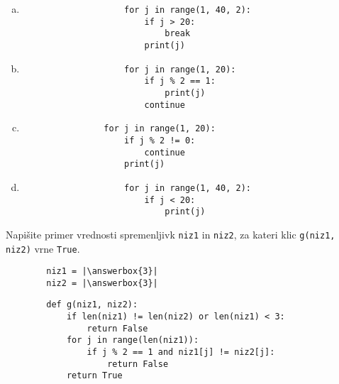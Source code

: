 \documentclass[arhiv, 10pt]{../izpit}
\newcommand{\inlinepy}[1]{\texttt{#1}}
\newcommand{\answerbox}[1]{\framebox{\vphantom{\large M}\hspace{#1cm}}}
\begin{document}
        \begin{multicols}{2}
        \begin{enumerate}[(a)]
\item 
                \begin{verbatim}
                    for j in range(1, 40, 2):
                        if j > 20:
                            break
                        print(j)
                \end{verbatim}
            
\item 
                \begin{verbatim}
                    for j in range(1, 20):
                        if j % 2 == 1:
                            print(j)
                        continue
                \end{verbatim}
            
\item 
            \begin{verbatim}
                for j in range(1, 20):
                    if j % 2 != 0:
                        continue
                    print(j)
            \end{verbatim}
        
\item 
                \begin{verbatim}
                    for j in range(1, 40, 2):
                        if j < 20:
                            print(j)
                \end{verbatim}
            
\end{enumerate}

        \end{multicols}
    
        \naloga*
        \begin{multicols}{2}
        \noindent
        Napišite primer vrednosti spremenljivk \inlinepy{niz1} in \inlinepy{niz2}, za kateri klic \inlinepy{g(niz1, niz2)} vrne \inlinepy{True}.
        \begin{verbatim}
        niz1 = |\answerbox{3}|
        niz2 = |\answerbox{3}|
        \end{verbatim}
        \vfil
        \columnbreak
        \begin{verbatim}
        def g(niz1, niz2):
            if len(niz1) != len(niz2) or len(niz1) < 3:
                return False
            for j in range(len(niz1)):
                if j % 2 == 1 and niz1[j] != niz2[j]:
                    return False
            return True
        \end{verbatim}
        \end{multicols}
    
\end{document}
